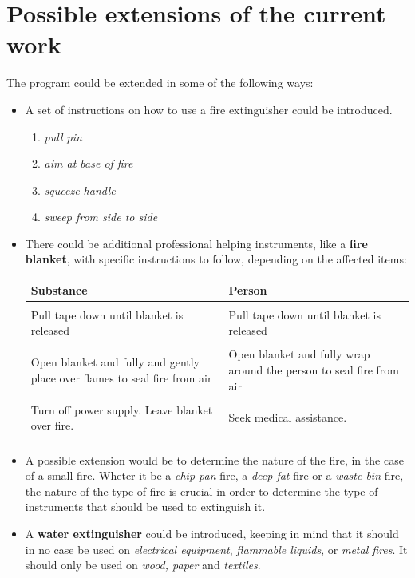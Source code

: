 \documentclass[a4paper,12pt]{report}
\begin{document}
\section{Possible extensions of the current work}

The program could be extended in some of the following ways:
\begin{itemize}
\item A set of instructions on how to use a fire extinguisher could be introduced.
	\begin{enumerate}
	\item {\it pull pin}
	\item {\it aim at base of fire}
	\item {\it squeeze handle}
	\item {\it sweep from side to side}
	\end{enumerate}
\item There could be additional professional helping instruments, like a \textbf{fire blanket}, with specific instructions to follow, depending on the affected items:


\begin{tabular}{ | p{7cm} | p{7cm} | }
	\hline
	{\color{BurntOrange} \textbf{Substance}} & {\color{BurntOrange} \textbf{Person}} \\ 
	\hline
	 & \\
	Pull tape down until blanket is released 
		& Pull tape down until blanket is released \\
	 & \\
	Open blanket and fully and gently place over flames to seal fire from air 
		& Open blanket and fully wrap around the person to seal fire from air \\
	 & \\
	Turn off power supply. Leave blanket over fire. 
		& Seek medical assistance. \\
	 & \\
	\hline
\end{tabular}

\item A possible extension would be to determine the nature of the fire, in the case of a small fire.
Wheter it be a {\color{Brown} {\it chip pan}} fire, a {\color{Brown} {\it deep fat}} fire or a {\color{Brown} {\it waste bin}} fire, the nature of the type of fire is crucial in order to determine the type of instruments that should be used to extinguish it.

\item A \textbf{water extinguisher} could be introduced, keeping in mind that it should in no case be used on {\color{Brown} {\it electrical equipment}}, {\color{Brown} {\it flammable liquids}}, or {\color{Brown} {\it metal fires}}. 
It should only be used on {\color{Brown} {\it wood, paper}} and {\color{Brown} {\it textiles}}.


\end{itemize}
\end{document}
